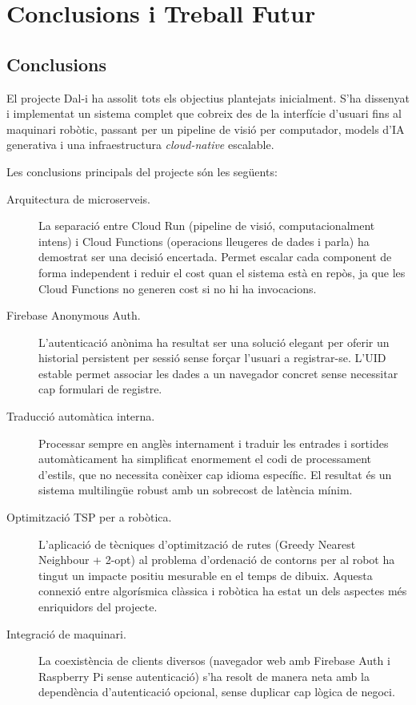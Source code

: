 \section{Conclusions i Treball Futur}
\label{sec:conclusions}

\subsection{Conclusions}

El projecte Dal-i ha assolit tots els objectius plantejats inicialment. S'ha dissenyat i implementat un sistema complet que cobreix des de la interfície d'usuari fins al maquinari robòtic, passant per un pipeline de visió per computador, models d'IA generativa i una infraestructura \textit{cloud-native} escalable.

Les conclusions principals del projecte són les següents:

\begin{description}
  \item[Arquitectura de microserveis.] La separació entre Cloud Run (pipeline de visió, computacionalment intens) i Cloud Functions (operacions lleugeres de dades i parla) ha demostrat ser una decisió encertada. Permet escalar cada component de forma independent i reduir el cost quan el sistema està en repòs, ja que les Cloud Functions no generen cost si no hi ha invocacions.

  \item[Firebase Anonymous Auth.] L'autenticació anònima ha resultat ser una solució elegant per oferir un historial persistent per sessió sense forçar l'usuari a registrar-se. L'UID estable permet associar les dades a un navegador concret sense necessitar cap formulari de registre.

  \item[Traducció automàtica interna.] Processar sempre en anglès internament i traduir les entrades i sortides automàticament ha simplificat enormement el codi de processament d'estils, que no necessita conèixer cap idioma específic. El resultat és un sistema multilingüe robust amb un sobrecost de latència mínim.

  \item[Optimització TSP per a robòtica.] L'aplicació de tècniques d'optimització de rutes (Greedy Nearest Neighbour + 2-opt) al problema d'ordenació de contorns per al robot ha tingut un impacte positiu mesurable en el temps de dibuix. Aquesta connexió entre algorísmica clàssica i robòtica ha estat un dels aspectes més enriquidors del projecte.

  \item[Integració de maquinari.] La coexistència de clients diversos (navegador web amb Firebase Auth i Raspberry Pi sense autenticació) s'ha resolt de manera neta amb la dependència d'autenticació opcional, sense duplicar cap lògica de negoci.
\end{description}

